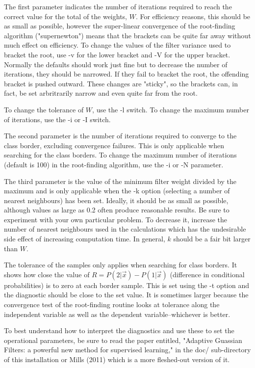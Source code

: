 \documentclass[12pt]{article}
\begin{document}
  The first parameter indicates the number of iterations required to reach the correct value for the total of the weights, $W$.  For efficiency reasons, this should be as small as possible, however the super-linear convergence of the root-finding algorithm ("supernewton") means that the brackets can be quite far away without much effect on efficiency.  To change the values of the filter variance used to bracket the root, use -v for the lower bracket and -V for the upper bracket.  Normally the defaults should work just fine but to decrease the number of iterations, they should be narrowed.  If they fail to bracket the root, the offending bracket is pushed outward.  These changes are "sticky", so the brackets can, in fact, be set arbritrarily narrow and even quite far from the root.

  To change the tolerance of $W$, use the -l switch.  To change the maximum number of iterations, use the -i or -I switch.

  The second parameter is the number of iterations required to converge to the class border, excluding convergence failures.  This is only applicable when searching for the class borders.  To change the maximum number of iterations (default is 100) in the root-finding algorithm, use the -i or -N parameter.

  The third parameter is the value of the minimum filter weight divided by the maximum and is only applicable when the -k option (selecting a number of nearest neighbours) has been set.  Ideally, it should be as small as possible, although values as large as 0.2 often produce reasonable results.  Be sure to experiment with your own particular problem.  To decrease it, increase the number of nearest neighbours used in the calculations which has the undesirable side effect of increasing computation time.  In general, $k$ should be a fair bit larger than $W$.

  The tolerance of the samples only applies when searching for class borders.  It shows how close the value of $R=P(2|\vec x)-P(1|\vec x)$ (difference in conditional probabilities) is to zero at each border sample.  This is set using the -t option and the diagnostic should be close to the set value.  It is sometimes larger because the convergence test of the root-finding routine looks at tolerance along the independent variable as well as the dependent variable--whichever is better.

  To best understand how to interpret the diagnostics and use these to set the operational parameters, be sure to read the paper entitled, "Adaptive Guassian Filters: a powerful new method for supervised learning," in the doc/ sub-directory of this installation or Mills (2011) which is a more fleshed-out version of it.
\end{document}
